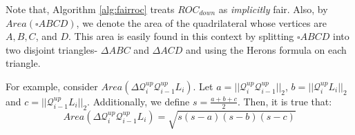 \documentclass{article}
\newcommand{\ouralgo}{\texttt{FROC}}
\begin{document}
    

    
    
Note that, Algorithm \ref{alg:fairroc} treats $ROC_{down}$ as \emph{implicitly} fair.
Also, by $Area(\square ABCD)$, we denote the area of the quadrilateral whose vertices are $A,B,C$, and $D$. This area is easily found in this context by splitting $\square ABCD$ into two disjoint triangles- $\Delta ABC$ and $\Delta ACD$ and using the Herons formula \cite{kendig20002000} on each triangle. 

For example, consider $Area(\Delta \mathcal{Q}_i^{up} \mathcal{Q}_{i-1}^{up} L_i)$. Let $a = ||\mathcal{Q}_i^{up} \mathcal{Q}_{i-1}^{up}||_2$, $b = ||\mathcal{Q}_i^{up} L_i||_2$ and $c = ||\mathcal{Q}_{i-1}^{up} L_i||_2$. Additionally, we define $s = \frac{a+b+c}{2}$. Then, it is true that:
\[Area(\Delta \mathcal{Q}_i^{up} \mathcal{Q}_{i-1}^{up} L_i ) = \sqrt{s(s-a)(s-b)(s-c)}\]
\end{document}
